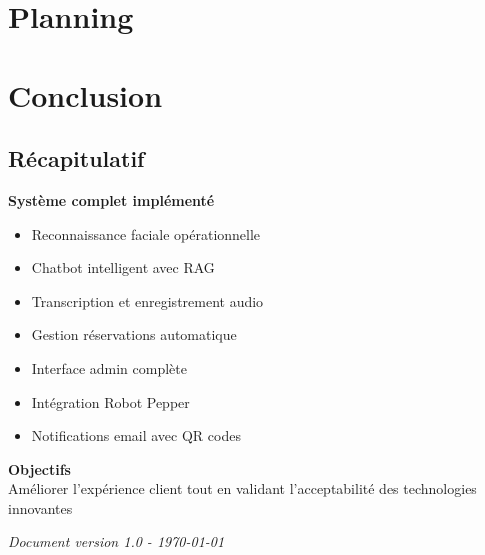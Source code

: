 \documentclass[12pt,a4paper]{article}
\newenvironment{block}[1]{\begin{center}\begin{minipage}{0.9\textwidth}\textbf{#1}\\}{\end{minipage}\end{center}}
\begin{document}

\section{Planning}



\section{Conclusion}

\subsection{Récapitulatif}

\begin{block}{Système complet implémenté}
\begin{itemize}
    \item[\textcolor{successgreen}{\faCheckCircle}] Reconnaissance faciale opérationnelle
    \item[\textcolor{successgreen}{\faCheckCircle}] Chatbot intelligent avec RAG
    \item[\textcolor{successgreen}{\faCheckCircle}] Transcription et enregistrement audio
    \item[\textcolor{successgreen}{\faCheckCircle}] Gestion réservations automatique
    \item[\textcolor{successgreen}{\faCheckCircle}] Interface admin complète
    \item[\textcolor{successgreen}{\faCheckCircle}] Intégration Robot Pepper
    \item[\textcolor{successgreen}{\faCheckCircle}] Notifications email avec QR codes
\end{itemize}
\end{block}

\begin{block}{Objectifs}
Améliorer l'expérience client tout en validant l'acceptabilité des technologies innovantes
\end{block}

\vspace{2cm}

\noindent\textit{Document version 1.0 - \today}
\end{document}
